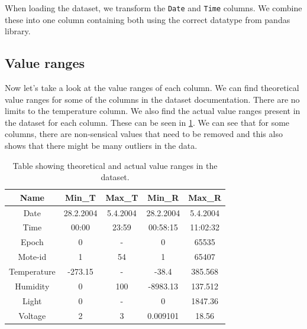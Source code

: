 \documentclass[a4paper,11pt]{article}
\begin{document}
	When loading the dataset, we transform the \texttt{Date} and \texttt{Time} columns. We combine these into one column containing both using the correct datatype from pandas library.
	
	\subsection{Value ranges}
	\label{subsection:ranges}
		Now let's take a look at the value ranges of each column. We can find theoretical value ranges for some of the columns in the dataset documentation. There are no limits to the temperature column. We also find the actual value ranges present in the dataset for each column. These can be seen in \ref{table:ranges}. We can see that for some columns, there are non-sensical values that need to be removed and this also shows that there might be many outliers in the data.
		\begin{table}[H]
			\centering
			\begin{tabular}{|c|c|c||c|c|}
				\hline
				Name & Min\_T & Max\_T & Min\_R & Max\_R \\
				\hline
				Date & 28.2.2004 & 5.4.2004 & 28.2.2004 & 5.4.2004 \\
				\hline
				Time & 00:00 & 23:59 & 00:58:15 & 11:02:32 \\
				\hline
				Epoch & 0 & - & 0 & 65535\\
				\hline
				Mote-id & 1 & 54 & 1 & 65407 \\
				\hline
				Temperature & -273.15 & - & -38.4 & 385.568 \\
				\hline
				Humidity & 0 & 100 & -8983.13 & 137.512 \\
				\hline
				Light & 0 & - & 0 & 1847.36\\
				\hline
				Voltage & 2 & 3 & 0.009101 & 18.56 \\
				\hline
			\end{tabular}

			\caption{Table showing theoretical and actual value ranges in the dataset.}
			\label{table:ranges}
		\end{table}
	
	
\end{document}
